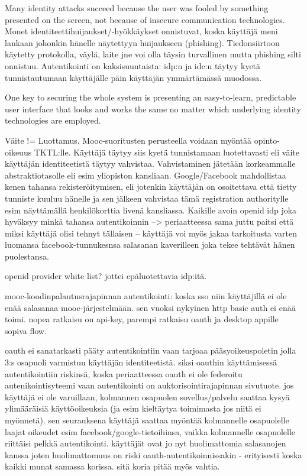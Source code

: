 \documentclass[finnish,gradu]{tktltiki}
\begin{document}
  Many identity attacks succeed because the user was fooled by something presented on the screen, not because of insecure  communication technologies. Monet identiteettihuijaukset/-hyökkäykset onnistuvat, koska käyttäjä meni lankaan johonkin hänelle näytettyyn huijaukseen (phishing). Tiedonsiirtoon käytetty protokolla, väylä, laite jne voi olla täysin turvallinen mutta phishing silti onnistuu. Autentikointi on kaksisuuntaista: idp:n ja idc:n täytyy kyetä tunnistautumaan käyttäjälle päin käyttäjän ymmärtämässä muodossa.

  One key to securing the whole system is presenting an easy-to-learn, predictable user interface that looks and works the same no matter which underlying identity technologies are employed.

  Väite != Luottamus. Mooc-suoritusten perusteella voidaan myöntää opinto-oikeuus TKTL:lle. Käyttäjä täytyy siis kyetä tunnistamaan luotettavasti eli väite käyttäjän identiteetistä täytyy vahvistaa. Vahvistaminen jätetään korkeammalle abstraktiotasolle eli esim yliopiston kansliaan. Google/Facebook mahdollistaa kenen tahansa rekisteröitymisen, eli jotenkin käyttäjän on osoitettava että tietty tunniste kuuluu hänelle ja sen jälkeen vahvistaa tämä registration authoritylle esim näyttämällä henkilökorttia livenä kansliassa. Kaikille avoin openid idp joka hyväksyy minkä tahansa autentikoinnin --> periaatteessa sama juttu paitsi että miksi käyttäjä olisi tehnyt tällaisen -- käyttäjä voi myös jakaa tarkoitusta varten luomansa facebook-tunnukesnsa salasanan kaverilleen joka tekee tehtävät hänen puolestansa.

  openid provider white list? jottei epäluotettavia idp:itä.

  mooc-koodinpalautusrajapinnan autentikointi: koska sso niin käyttäjillä ei ole enää salasanaa mooc-järjestelmään. sen vuoksi nykyinen http basic auth ei enää toimi. nopea ratkaisu on api-key, parempi ratkaisu oauth ja desktop appille sopiva flow.

  oauth ei sanatarkasti pääty autentikointiin vaan tarjoaa pääsyoikeuspoletin jolla 3:s osapuoli varmistuu käyttäjän identiteetistä. siksi oauthin käyttämisessä autentikointiin riskinsä, koska periaatteessa oauth ei ole federoitu autenikointisyteemi vaan autentikointi on auktorisointirajapinnan sivutuote. jos käyttäjä ei ole varuillaan, kolmannen osapuolen sovellus/palvelu saattaa kysyä ylimääräisiä käyttöoikeuksia (ja esim kieltäytya toimimasta jos niitä ei myönnetä). sen seurauksena käyttäjä saattaa myöntää kolmannelle osapuolelle laajat oikeudet esim facebook/google-tietoihinsa, vaikka kolmannelle osapuolelle riittäisi pelkkä autentikointi. käyttäjät ovat jo nyt huolimattomia salasanojen kanssa joten huolimattomuus on riski oauth-autentikoinnissakin - erityisesti koska kaikki munat samassa korissa. sitä koria pitää myös vahtia.
\end{document}

